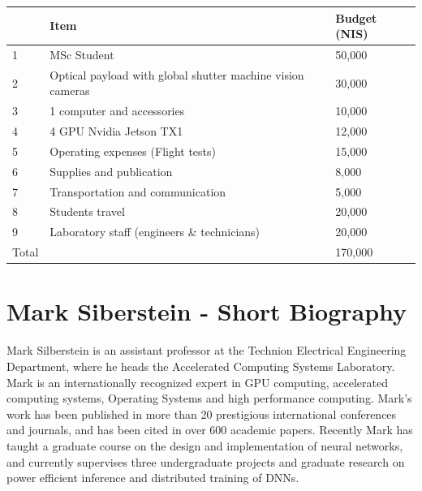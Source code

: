 \documentclass{article} %
\begin{document}
\begin{center}
	\begin{tabular}{ | l | l | l | }
		\hline
		      & Item                                                       & Budget (NIS) \\ \hline
		1     & MSc Student                                                & 50,000       \\ \hline
		2     & Optical payload with global shutter machine vision cameras & 30,000       \\ \hline
		3     & 1 computer and accessories                                 & 10,000       \\ \hline
		4     & 4 GPU Nvidia Jetson TX1                                    & 12,000       \\ \hline
		5     & Operating expenses (Flight tests)                          & 15,000       \\ \hline
		6     & Supplies and publication                                   & 8,000        \\ \hline
		7     & Transportation and communication                           & 5,000        \\ \hline
		8     & Students travel                                            & 20,000       \\ \hline
		9     & Laboratory staff (engineers \& technicians)                & 20,000       \\ \hline
		Total &                                                            & 170,000      \\ \hline
	\end{tabular}
\end{center}

\section{Mark Siberstein - Short Biography}
Mark Silberstein is an assistant professor at the Technion Electrical
Engineering Department, where he heads the Accelerated Computing Systems
Laboratory.  Mark is an internationally recognized expert in GPU computing, accelerated computing systems,
Operating Systems and high performance computing.  Mark's work has been published in more than
20 prestigious international conferences and journals, and has been cited in
over 600 academic papers. Recently Mark has taught a graduate course on the
design and implementation of  neural networks, and currently supervises three
undergraduate projects and graduate research  on power efficient inference and distributed
training of DNNs.



\end{document}
